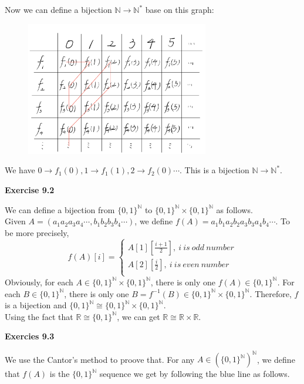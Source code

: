 \documentclass{article} %
\begin{document}
    Now we can define a bijection $\mathbb{N}\rightarrow \mathbb{N}^*$ base on this graph:
    \begin{figure}[H]
  	\centering
  	\includegraphics[width=8cm]{9_1_3.png}
  	\caption{}
  	\label{}
  	\end{figure}
    We have $0\rightarrow f_1\left(0\right),1\rightarrow f_1\left(1\right),2\rightarrow f_2\left(0\right)\cdots$. This is a bijection $\mathbb{N}\rightarrow \mathbb{N}^*$.


\textbf{Exercise 9.2}\par
We can define a bijection from $\{0,1\}^\mathbb{N}$ to $\{0,1\}^\mathbb{N}\times \{0,1\}^\mathbb{N}$ as follows.\\
Given $A=(a_1a_2a_3a_4\cdots,b_1b_2b_3b_4\cdots)$, we define $f(A)=a_1b_1a_2b_2a_3b_3a_4b_4\cdots$. To be more precisely, 
$$ f(A)[i]=\left\{
\begin{aligned}
A[1][\frac{i+1}{2}],\ i\ is\ odd\ number \\
A[2][\frac{i}{2}],\ i\ is\ even\ number \\
\end{aligned}
\right.
$$
Obviously, for each $A\in \{0,1\}^\mathbb{N}\times \{0,1\}^\mathbb{N}$, there is only one $f(A)\in \{0,1\}^\mathbb{N}$. For each $B\in \{0,1\}^\mathbb{N}$, there is only one $B=f^{-1}(B)\in \{0,1\}^\mathbb{N}\times \{0,1\}^\mathbb{N}$. Therefore, $f$ is a bijection and $\{0,1\}^\mathbb{N}\cong \{0,1\}^\mathbb{N}\times\{0,1\}^\mathbb{N}$.\\
Using the fact that $\mathbb{R}\cong \{0,1\}^\mathbb{N}$, we can get $\mathbb{R}\cong \mathbb{R}\times \mathbb{R}$.

\textbf{Exercies 9.3}\par
We use the Cantor's method to proove that. For any $A\in (\{0,1\}^\mathbb{N})^\mathbb{N}$, we define that $f(A)$ is the $\{0,1\}^\mathbb{N}$ sequence we get by following the blue line as follows.
 
\end{document}
